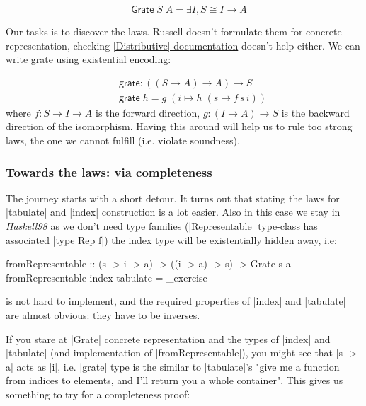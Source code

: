 \documentclass{article}
\begin{document}
\begin{equation}
\quad \mathsf{Grate}\;S\;A = \exists I, S \cong I \to A
\end{equation}

Our tasks is to discover the laws. Russell doesn't formulate them for
concrete representation, checking
\href{http://hackage.haskell.org/package/distributive-0.6/docs/Data-Distributive.html}{|Distributive| documentation}
doesn't help either. We can write grate using existential encoding:

\begin{equation}
\begin{aligned}
  \quad & \mathsf{grate} : ((S \to A) \to A) \to S \\
        & \mathsf{grate}\; h = g\; (i \mapsto h\; (s \mapsto f\, s\, i))
\end{aligned}
\end{equation}
where $f : S \to I \to A$ is the forward direction,
$g : (I \to A) \to S $ is the backward direction of the isomorphism.
Having this around will help us to rule too strong laws, the one
we cannot fulfill (i.e. violate soundness).

\subsubsection{Towards the laws: via completeness}

The journey starts with a short detour. It turns out that stating the laws
for |tabulate| and |index| construction is a lot easier.
Also in this case we stay in \emph{Haskell98} as we don't need type families
(|Representable| type-class has associated |type Rep f|)
the index type will be existentially hidden away, i.e:

\begin{code}
fromRepresentable :: (s -> i -> a) -> ((i -> a) -> s) -> Grate s a
fromRepresentable index tabulate = _exercise
\end{code}

is not hard to implement, and the required properties of |index| and |tabulate|
are almost obvious: they have to be inverses.

If you stare at |Grate| concrete representation and the types of |index| and
|tabulate| (and implementation of |fromRepresentable|), you might see
that |s -> a| acts as |i|, i.e. |grate| type is the similar to |tabulate|'s
"give me a function from indices to elements, and I'll return you a whole container".
This gives us something to try for a completeness proof:
\end{document}

